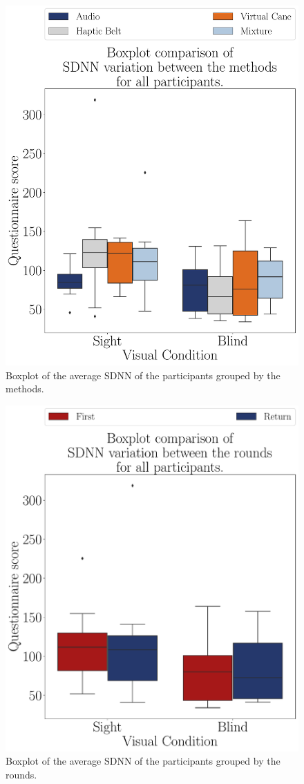 \begin{figure}[!htb]
    \centering
    \includegraphics[width = 0.75\linewidth]{3 - Resultados/Figuras/boxplot_ecg_sdnn_4_scene.pdf}
    \caption{Boxplot of the average SDNN of the participants grouped by the methods.}
    \label{fig:boxplot_ecg_sdnn_4_scene}
\end{figure}
\begin{figure}[!htb]
    \centering
    \includegraphics[width = 0.75\linewidth]{3 - Resultados/Figuras/boxplot_ecg_sdnn_4_rounds.pdf}
    \caption{Boxplot of the average SDNN of the participants grouped by the rounds.}
    \label{fig:boxplot_ecg_sdnn_4_rounds}
\end{figure}
 
